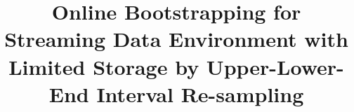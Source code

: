 \documentclass[a4paper,fleqn]{cas-dc}
\begin{document}
\let\WriteBookmarks\relax
\def\floatpagepagefraction{1}
\def\textpagefraction{.001}

\shorttitle{}    


\title [mode = title]{Online Bootstrapping for Streaming Data Environment with Limited Storage
by Upper-Lower-End Interval Re-sampling}  

\tnotemark[1] 

\tnotetext[1]{} 

%

%
%
%
%
%
%
%
%
%
%
%
%
%
%
%


\end{document}
